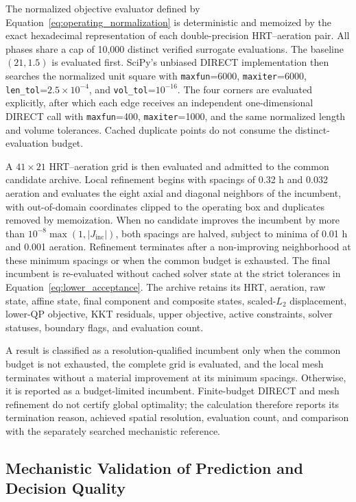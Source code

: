 \documentclass[a4paper,fleqn]{cas-sc}
\begin{document}
The normalized objective evaluator defined by Equation~\eqref{eq:operating_normalization} is deterministic and memoized by the exact hexadecimal representation of each double-precision HRT--aeration pair. All phases share a cap of 10,000 distinct verified surrogate evaluations. The baseline $(21,1.5)$ is evaluated first. SciPy's unbiased DIRECT implementation then searches the normalized unit square with \texttt{maxfun}=6000, \texttt{maxiter}=6000, \texttt{len\_tol}=$2.5\times10^{-4}$, and \texttt{vol\_tol}=$10^{-16}$. The four corners are evaluated explicitly, after which each edge receives an independent one-dimensional DIRECT call with \texttt{maxfun}=400, \texttt{maxiter}=1000, and the same normalized length and volume tolerances. Cached duplicate points do not consume the distinct-evaluation budget.

A $41\times21$ HRT--aeration grid is then evaluated and admitted to the common candidate archive. Local refinement begins with spacings of 0.32 h and 0.032 aeration and evaluates the eight axial and diagonal neighbors of the incumbent, with out-of-domain coordinates clipped to the operating box and duplicates removed by memoization. When no candidate improves the incumbent by more than $10^{-8}\max(1,|J_{\mathrm{inc}}|)$, both spacings are halved, subject to minima of 0.01 h and 0.001 aeration. Refinement terminates after a non-improving neighborhood at these minimum spacings or when the common budget is exhausted. The final incumbent is re-evaluated without cached solver state at the strict tolerances in Equation~\eqref{eq:lower_acceptance}. The archive retains its HRT, aeration, raw state, affine state, final component and composite states, scaled-$L_2$ displacement, lower-QP objective, KKT residuals, upper objective, active constraints, solver statuses, boundary flags, and evaluation count.

A result is classified as a resolution-qualified incumbent only when the common budget is not exhausted, the complete grid is evaluated, and the local mesh terminates without a material improvement at its minimum spacings. Otherwise, it is reported as a budget-limited incumbent. Finite-budget DIRECT and mesh refinement do not certify global optimality; the calculation therefore reports its termination reason, achieved spatial resolution, evaluation count, and comparison with the separately searched mechanistic reference.

\subsection{Mechanistic Validation of Prediction and Decision Quality}
\end{document}
